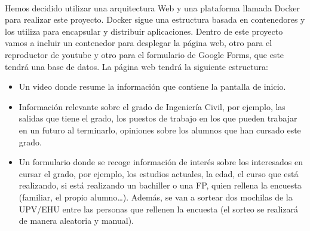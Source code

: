 \documentclass{report}
\begin{document}
        \paragraph*{}
        Hemos decidido utilizar una arquitectura Web y una plataforma llamada Docker para realizar este proyecto. Docker sigue una estructura basada en contenedores y los utiliza para encapsular y distribuir aplicaciones. Dentro de este proyecto vamos a incluir un contenedor para desplegar la página web, otro para el reproductor de youtube y otro para el formulario de Google Forms, que este tendrá una base de datos. La página web tendrá la siguiente estructura:
        \begin{itemize}
            \item Un video donde resume la información que contiene la pantalla de inicio.
            \item Información relevante sobre el grado de Ingeniería Civil, por ejemplo, las salidas que tiene el grado, los puestos de trabajo en los que pueden trabajar en un futuro al terminarlo, opiniones sobre los alumnos que han cursado este grado.
            \item Un formulario donde se recoge información de interés sobre los interesados en cursar el grado, por ejemplo, los estudios actuales, la edad, el curso que está realizando, si está realizando un bachiller o una FP, quien rellena la encuesta (familiar, el propio alumno…). Además, se van a sortear dos mochilas de la UPV/EHU entre las personas que rellenen la encuesta (el sorteo se realizará de manera aleatoria y manual).
        \end{itemize}
        
\end{document}
